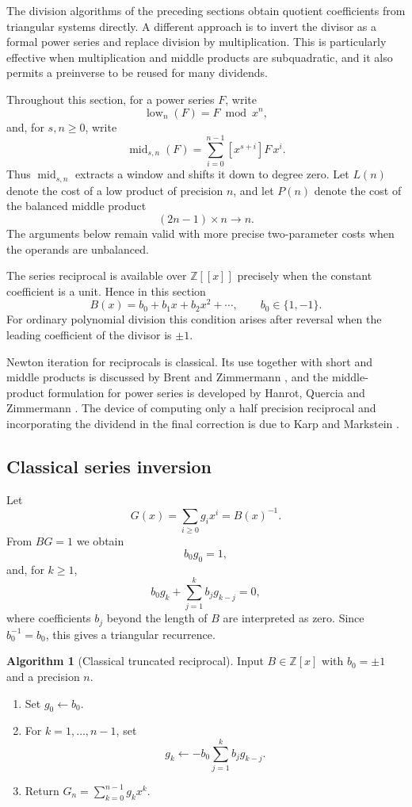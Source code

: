\documentclass[11pt]{book}
\theoremstyle{definition}
\newtheorem{algorithm}[theorem]{Algorithm}
\newcommand{\ZZ}{\mathbb Z}
\begin{document}
The division algorithms of the preceding sections obtain quotient coefficients
from triangular systems directly.  A different approach is to invert the
divisor as a formal power series and replace division by multiplication.  This
is particularly effective when multiplication and middle products are
subquadratic, and it also permits a preinverse to be reused for many dividends.

Throughout this section, for a power series $F$, write
\[
 \operatorname{low}_n(F)=F\bmod x^n,
\]
and, for $s,n\geq0$, write
\[
 \operatorname{mid}_{s,n}(F)
   =\sum_{i=0}^{n-1}[x^{s+i}]F\,x^i.
\]
Thus $\operatorname{mid}_{s,n}$ extracts a window and shifts it down to degree
zero.  Let $L(n)$ denote the cost of a low product of precision $n$, and let
$P(n)$ denote the cost of the balanced middle product
\[
 (2n-1)\times n\longrightarrow n.
\]
The arguments below remain valid with more precise two-parameter costs when the
operands are unbalanced.

The series reciprocal is available over $\ZZ[[x]]$ precisely when the constant
coefficient is a unit.  Hence in this section
\[
 B(x)=b_0+b_1x+b_2x^2+\cdots,
 \qquad b_0\in\{1,-1\}.
\]
For ordinary polynomial division this condition arises after reversal when the
leading coefficient of the divisor is $\pm1$.

Newton iteration for reciprocals is classical.  Its use together with short and
middle products is discussed by Brent and Zimmermann
\cite{BrentZimmermann2010}, and the middle-product formulation for power
series is developed by Hanrot, Quercia and Zimmermann
\cite{HanrotQuerciaZimmermann2004}.  The device of computing only a half
precision reciprocal and incorporating the dividend in the final correction is
due to Karp and Markstein \cite{KarpMarkstein1997}.

\subsection{Classical series inversion}

Let
\[
 G(x)=\sum_{i\geq0}g_i x^i=B(x)^{-1}.
\]
From $BG=1$ we obtain
\[
 b_0g_0=1,
\]
and, for $k\geq1$,
\begin{equation}\label{eq:inverse-coefficient-recurrence}
 b_0g_k+\sum_{j=1}^{k}b_jg_{k-j}=0,
\end{equation}
where coefficients $b_j$ beyond the length of $B$ are interpreted as zero.
Since $b_0^{-1}=b_0$, this gives a triangular recurrence.

\begin{algorithm}[Classical truncated reciprocal]\label{alg:inverse-classical}
Input $B\in\ZZ[x]$ with $b_0=\pm1$ and a precision $n$.
\begin{enumerate}
 \item Set $g_0\leftarrow b_0$.
 \item For $k=1,\ldots,n-1$, set
 \[
  g_k\leftarrow-b_0\sum_{j=1}^{k}b_jg_{k-j}.
 \]
 \item Return $G_n=\sum_{k=0}^{n-1}g_kx^k$.
\end{enumerate}
\end{algorithm}
\end{document}
